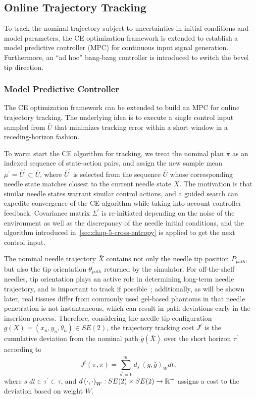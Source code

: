 \subsection{Online Trajectory Tracking}
\label{sec:trajectory_tracking}

To track the nominal trajectory subject to uncertainties in initial conditions and model parameters, the CE optimization framework is extended to establish a model predictive controller (MPC) for continuous input signal generation. Furthermore, an ``ad hoc'' bang-bang controller is introduced to switch the bevel tip direction.

\subsubsection{Model Predictive Controller}
\label{sec:chap-5-mpc}
The CE optimization framework can be extended to build an MPC for online trajectory tracking. The underlying idea is to execute a single control input sampled from $\bar{U}$ that minimizes tracking error within a short window in a receding-horizon fashion.

To warm start the CE algorithm for tracking, we treat the nominal plan $\bar{\pi}$ as an indexed sequence of state-action pairs, and assign the new sample mean $\mu^{\prime} = \bar{U}^{\prime} \subset \bar{U}$, where $\bar{U}^{\prime}$ is selected from the sequence $\bar{U}$ whose corresponding needle state matches closest to the current needle state $X$. The motivation is that similar needle states warrant similar control actions, and a guided search can expedite convergence of the CE algorithm while taking into account controller feedback. Covariance matrix $\Sigma^{\prime}$ is re-initiated depending on the noise of the environment as well as the discrepancy of the needle initial conditions, and the algorithm introduced in~\cref{sec:chap-5-cross-entropy} is applied to get the next control input. 

The nominal needle trajectory $\bar{X}$ contains not only the needle tip position $P_{path}$, but also the tip orientation $\theta_{path}$ returned by the simulator. For off-the-shelf needles, tip orientation plays an active role in determining long-term needle trajectory, and is important to track if possible~\parencite{wangShapeManipulationBevelTip2024}; additionally, as will be shown later, real tissues differ from commonly used gel-based phantoms in that needle penetration is not instantaneous, which can result in path deviations early in the insertion process. Therefore, considering the needle tip configuration $g(X) = \left( x_n, y_n, \theta_n \right)\in SE(2)$, the trajectory tracking cost $J^t$ is the cumulative deviation from the nominal path $\bar{g}(\bar{X})$ over the short horizon $\tau^{\prime}$ according to
\begin{equation}
  \label{eq:chap-5-exec-cost}
  J^t(\pi, \bar{\pi}) = \sum_{s^{\prime} = 0}^{m^{\prime}}d_{s^{\prime}} \left( g, \bar{g} \right)_Wdt,
\end{equation}
where $s^{\prime}dt \in \tau^{\prime} \subset \tau$, and $d \left( \cdot, \cdot \right)_W : SE(2)\times SE(2) \to \mathbb{R}^+$ assigns a cost to the deviation based on weight $W$.

